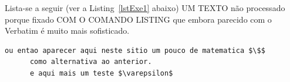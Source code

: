 \documentclass[11pt,a4paper]{report}%
\begin{document}
Lista-se a seguir (ver a Listing~\ref{lstExe1} abaixo) UM TEXTO não processado porque fixado COM O COMANDO LISTING 
que embora parecido com o Verbatim é muito mais sofisticado.

\begin{lstlisting}[caption={Exemplo de uma Listagem}, label={lstExe1}]
      ou entao aparecer aqui neste sitio um pouco de matematica $\$$
      como alternativa ao anterior.
      e aqui mais um teste $\varepsilon$
\end{lstlisting}

\newpage





\end{document}
